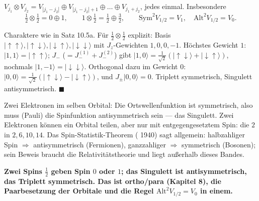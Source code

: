 \begin{merksatz}
$V_{j_1}\otimes V_{j_2} = V_{|j_1 - j_2|}\oplus V_{|j_1 - j_2| + 1}\oplus\dots\oplus V_{j_1 + j_2}$, jedes einmal. Insbesondere
\[ \tfrac12\otimes\tfrac12 = 0\oplus1,\qquad1\otimes\tfrac12 = \tfrac12\oplus\tfrac32,\qquad\mathrm{Sym}^{2}V_{1/2} = V_1,\quad\mathrm{Alt}^{2}V_{1/2} = V_0 . \]

Charaktere wie in Satz 10.5a. Für $\frac12\otimes\frac12$ explizit: Basis $|{\uparrow\uparrow}\rangle, |{\uparrow\downarrow}\rangle, |{\downarrow\uparrow}\rangle, |{\downarrow\downarrow}\rangle$ mit $J_z$-Gewichten $1, 0, 0, -1$. Höchstes Gewicht $1$: $|1, 1\rangle = |{\uparrow\uparrow}\rangle$; $J_-$ ($= J_-^{(1)} + J_-^{(2)}$) gibt $|1, 0\rangle = \frac1{\sqrt2}(|{\uparrow\downarrow}\rangle + |{\downarrow\uparrow}\rangle)$, nochmals $|1, -1\rangle = |{\downarrow\downarrow}\rangle$. Orthogonal dazu im Gewicht $0$: $|0, 0\rangle = \frac1{\sqrt2}(|{\uparrow\downarrow}\rangle - |{\downarrow\uparrow}\rangle)$, und $J_\pm|0, 0\rangle = 0$. Triplett symmetrisch, Singulett antisymmetrisch. $\blacksquare$

Zwei Elektronen im selben Orbital: Die Ortswellenfunktion ist symmetrisch, also muss (Pauli) die Spinfunktion antisymmetrisch sein --- das Singulett. Zwei Elektronen können ein Orbital teilen, aber nur mit entgegengesetztem Spin: die $2$ in $2, 6, 10, 14$. Das Spin-Statistik-Theorem ( 1940) sagt allgemein: halbzahliger Spin $\Rightarrow$ antisymmetrisch (Fermionen), ganzzahliger $\Rightarrow$ symmetrisch (Bosonen); sein Beweis braucht die Relativitätstheorie und liegt außerhalb dieses Bandes.

\begin{center}
\begin{minipage}{0.9\textwidth}
\textbf{Zwei Spins $\tfrac12$ geben Spin $0$ oder $1$; das Singulett ist antisymmetrisch, das Triplett symmetrisch. Das ist ortho/para (Kapitel 8), die Paarbesetzung der Orbitale und die Regel $\mathrm{Alt}^{2}V_{1/2} = V_0$ in einem.}
\end{minipage}
\end{center}
\end{merksatz}

